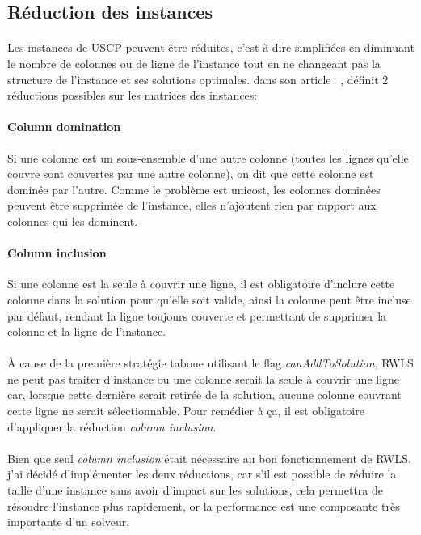 \documentclass[a4paper,11pt,twoside,french,report]{../common/simplem}
\begin{document}
			\subsection{Réduction des instances}\label{sec:reduction}
				\paragraph*{}
					Les instances de \gls{USCP} peuvent être réduites, c'est-à-dire simplifiées en diminuant le nombre de colonnes ou de ligne de l'instance tout en ne changeant pas la structure de l'instance et ses solutions optimales. \citeauthor{Beasley1987} dans son article ~\cite{Beasley1987}, définit 2 réductions possibles sur les matrices des instances:
				\paragraph*{Column domination\\}
					Si une colonne est un sous-ensemble d'une autre colonne (toutes les lignes qu'elle couvre sont couvertes par une autre colonne), on dit que cette colonne est dominée par l'autre. Comme le problème est unicost, les colonnes dominées peuvent être supprimée de l'instance, elles n'ajoutent rien par rapport aux colonnes qui les dominent.
				\paragraph*{Column inclusion\\}
					Si une colonne est la seule à couvrir une ligne, il est obligatoire d'inclure cette colonne dans la solution pour qu'elle soit valide, ainsi la colonne peut être incluse par défaut, rendant la ligne toujours couverte et permettant de supprimer la colonne et la ligne de l'instance.
				\paragraph*{}
					À cause de la première stratégie taboue utilisant le flag \textit{canAddToSolution}, \gls{RWLS} ne peut pas traiter d'instance ou une colonne serait la seule à couvrir une ligne car, lorsque cette dernière serait retirée de la solution, aucune colonne couvrant cette ligne ne serait sélectionnable. Pour remédier à ça, il est obligatoire d'appliquer la réduction \textit{column inclusion}.
				\paragraph*{}
					Bien que seul \textit{column inclusion} était nécessaire au bon fonctionnement de \gls{RWLS}, j'ai décidé d'implémenter les deux réductions, car s'il est possible de réduire la taille d'une instance sans avoir d'impact sur les solutions, cela permettra de résoudre l'instance plus rapidement, or la performance est une composante très importante d'un solveur.
\end{document}
